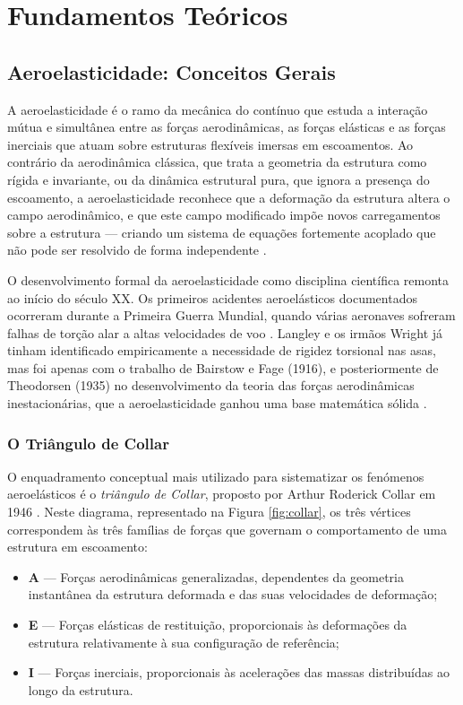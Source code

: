 \documentclass[11pt,twoside,a4paper]{report}
\begin{document}
\chapter{Fundamentos Teóricos}

\section{Aeroelasticidade: Conceitos Gerais}

A aeroelasticidade é o ramo da mecânica do contínuo que estuda a interação mútua e simultânea entre as forças aerodinâmicas, as forças elásticas e as forças inerciais que atuam sobre estruturas flexíveis imersas em escoamentos. Ao contrário da aerodinâmica clássica, que trata a geometria da estrutura como rígida e invariante, ou da dinâmica estrutural pura, que ignora a presença do escoamento, a aeroelasticidade reconhece que a deformação da estrutura altera o campo aerodinâmico, e que este campo modificado impõe novos carregamentos sobre a estrutura --- criando um sistema de equações fortemente acoplado que não pode ser resolvido de forma independente \cite{Bisplinghoff1996, Dowell2004}.

O desenvolvimento formal da aeroelasticidade como disciplina científica remonta ao início do século XX. Os primeiros acidentes aeroelásticos documentados ocorreram durante a Primeira Guerra Mundial, quando várias aeronaves sofreram falhas de torção alar a altas velocidades de voo \cite{Collar1946}. Langley e os irmãos Wright já tinham identificado empiricamente a necessidade de rigidez torsional nas asas, mas foi apenas com o trabalho de Bairstow e Fage (1916), e posteriormente de Theodorsen (1935) no desenvolvimento da teoria das forças aerodinâmicas inestacionárias, que a aeroelasticidade ganhou uma base matemática sólida \cite{Fung1993, Theodorsen1935}.

\subsection{O Triângulo de Collar}

O enquadramento conceptual mais utilizado para sistematizar os fenómenos aeroelásticos é o \textit{triângulo de Collar}, proposto por Arthur Roderick Collar em 1946 \cite{Collar1946}. Neste diagrama, representado na Figura \ref{fig:collar}, os três vértices correspondem às três famílias de forças que governam o comportamento de uma estrutura em escoamento:

\begin{itemize}
    \item \textbf{A} --- Forças aerodinâmicas generalizadas, dependentes da geometria instantânea da estrutura deformada e das suas velocidades de deformação;
    \item \textbf{E} --- Forças elásticas de restituição, proporcionais às deformações da estrutura relativamente à sua configuração de referência;
    \item \textbf{I} --- Forças inerciais, proporcionais às acelerações das massas distribuídas ao longo da estrutura.
\end{itemize}
\end{document}
